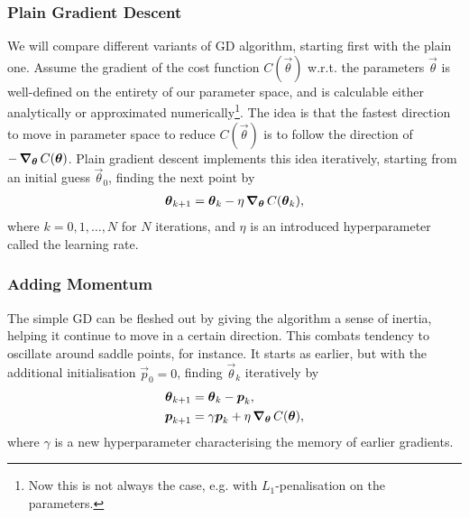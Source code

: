     \subsubsection{Plain Gradient Descent}
        We will compare different variants of GD algorithm, starting first with the plain one. Assume the gradient of the cost function $C(\vec{\theta})$ w.r.t. the parameters $\vec{\theta}$ is well-defined on the entirety of our parameter space, and is calculable either analytically or approximated numerically\footnote{Now this is not always the case, e.g. with $L_1$-penalisation on the parameters.}. The idea is that the fastest direction to move in parameter space to reduce $C(\vec{\theta})$ is to follow the direction of $-\operatorname{\operatorname{\boldsymbol{\nabla}}_{\boldsymbol{\theta}}} C(\boldsymbol{\theta})$. Plain gradient descent implements this idea iteratively, starting from an initial guess $\vec{\theta}_0$, finding the next point by
        \begin{align}
            \boldsymbol{\theta}_{k+1} = \boldsymbol{\theta}_k - \eta \operatorname{\operatorname{\boldsymbol{\nabla}}_{\boldsymbol{\theta}}} C(\boldsymbol{\theta}_k),
        \end{align}
        where $k=0,1,\ldots,N$ for $N$ iterations, and $\eta$ is an introduced hyperparameter called the learning rate.

    \subsubsection{Adding Momentum}
        The simple GD can be fleshed out by giving the algorithm a sense of inertia, helping it continue to move in a certain direction. This combats tendency to oscillate around saddle points, for instance. It starts as earlier, but with the additional initialisation $\vec{p}_0 = 0$, finding $\vec{\theta}_k$ iteratively by 
        \begin{subequations}
            \begin{align}
                \boldsymbol{\theta}_{k+1} &= \boldsymbol{\theta}_k - \boldsymbol{p}_k, \\
                \boldsymbol{p}_{k+1} &= \gamma \boldsymbol{p}_k + \eta \operatorname{\operatorname{\boldsymbol{\nabla}}_{\boldsymbol{\theta}}} C(\boldsymbol{\theta}),
            \end{align}
        \end{subequations}
        where $\gamma$ is a new hyperparameter characterising the memory of earlier gradients.

